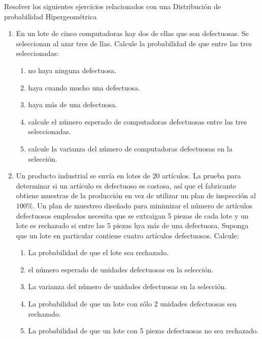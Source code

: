 \begin{Ejer}
Resolver los siguientes ejercicios relacionados con una Distribución de probabilidad Hipergeométrica

\begin{enumerate}
\item En un lote de cinco computadoras hay dos de ellas que son defectuosas. Se seleccionan al azar tres de llas. Calcule la probabilidad de que entre las tres seleccionadas:
\begin{enumerate}
\item no haya ninguna defectuosa.
\item haya cuando mucho una defectuosa.
\item haya más de una defectuosa.
\item calcule el número esperado de computadoras defectuosas entre las tres seleccionadas.
\item calcule la varianza del número de computadoras defectuosas en la selección.
\end{enumerate}

\item Un producto industrial se envía en lotes de 20 artículos. La prueba para determinar si un artículo es defectuoso es costosa, así que el fabricante obtiene muestras de la producción en vez de utilizar un plan de inspección al $100\%$. Un plan de muestreo diseñado para minimizar el número de artículos defectuosos empleados necesita que se extraigan 5 piezas de cada lote y un lote es rechazado si entre las 5 piezas hya más de una defectuosa. Suponga que un lote en particular contiene cuatro artículos defectuosos. Calcule:

\begin{enumerate}
\item La probabilidad de que el lote sea rechazado.
\item el número esperado de unidades defectuosas en la selección.
\item La varianza del número de unidades defectuosas en la selección.
\item La probabilidad de que un lote con sólo 2 unidades defectuosas sea rechazado.
\item La probabilidad de que un lote con 5 piezas defectuosas no sea rechazado.
\end{enumerate}

\end{enumerate}
\end{Ejer}


